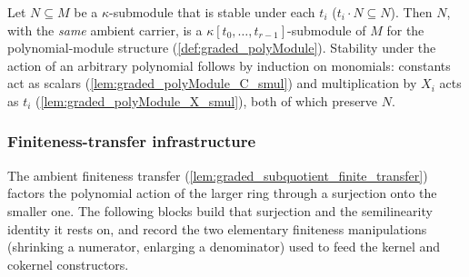\begin{definition}
  \label{def:graded_polySubmodule}
  Let \(N \subseteq M\) be a \(\kappa\)-submodule that is stable under each \(t_i\)
  (\(t_i \cdot N \subseteq N\)). Then \(N\), with the \emph{same} ambient carrier, is a
  \(\kappa[t_0, \dots, t_{r-1}]\)-submodule of \(M\) for the polynomial-module structure
  (\cref{def:graded_polyModule}). Stability under the action of an arbitrary polynomial
  follows by induction on monomials: constants act as scalars
  (\cref{lem:graded_polyModule_C_smul}) and multiplication by \(X_i\) acts as \(t_i\)
  (\cref{lem:graded_polyModule_X_smul}), both of which preserve \(N\).
\end{definition}


\subsubsection*{Finiteness-transfer infrastructure}

The ambient finiteness transfer (\cref{lem:graded_subquotient_finite_transfer})
factors the polynomial action of the larger ring through a surjection onto the
smaller one. The following blocks build that surjection and the semilinearity
identity it rests on, and record the two elementary finiteness manipulations
(shrinking a numerator, enlarging a denominator) used to feed the kernel and
cokernel constructors.

